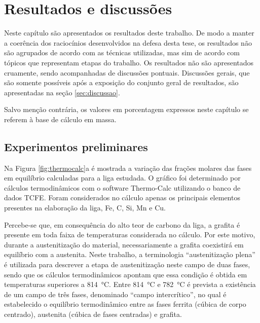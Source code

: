 \chapter{Resultados e discussões}

Neste capítulo são apresentados os resultados deste trabalho. De modo a manter a coerência dos raciocínios desenvolvidos na defesa desta tese, os resultados não são agrupados de acordo com as técnicas utilizadas, mas sim de acordo com tópicos que representam etapas do trabalho. Os resultados não são apresentados cruamente, sendo acompanhadas de discussões pontuais. Discussões gerais, que são somente possíveis após a exposição do conjunto geral de resultados, são apresentadas na seção \ref{sec:discussao}.


Salvo menção contrária, os valores em porcentagem expressos neste capítulo se referem à base de cálculo em massa.

\section{Experimentos preliminares}

\label{sec:expprelim}

Na Figura \ref{fig:thermocalc}a é mostrada a variação das frações molares das fases em equilíbrio calculadas para a liga estudada. O gráfico foi determinado por cálculos termodinâmicos com o software Thermo-Calc\textregistered{} utilizando o banco de dados TCFE. Foram considerados no cálculo apenas os principais elementos presentes na elaboração da liga, Fe, C, Si, Mn e Cu.

Percebe-se que, em consequência do alto teor de carbono da liga, a grafita é presente em toda faixa de temperaturas considerada no cálculo. Por este motivo, durante a austenitização do material, necessariamente a grafita coexistirá em equilíbrio com a austenita. Neste trabalho, a terminologia ``austenitização plena'' é utilizada para descrever a etapa de austenitização neste campo de duas fases, sendo que os cálculos termodinâmicos apontam que essa condição é obtida em temperaturas superiores a \SI{814}{\degreeCelsius}. Entre \SI{814}{\degreeCelsius} e \SI{782}{\degreeCelsius} é prevista a existência de um campo de três fases, denominado ``campo intercrítico'', no qual é estabelecido o equilíbrio termodinâmico entre as fases ferrita (cúbica de corpo centrado), austenita (cúbica de fases centradas) e grafita.

